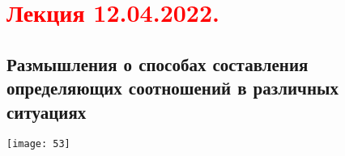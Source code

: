 \documentclass[main.tex]{subfiles}
\begin{document}
\section{\textcolor{red}{Лекция 12.04.2022.}}

\subsection{Размышления о способах составления определяющих соотношений в различных ситуациях}
\texttt{[image: 53]}





\end{document}
